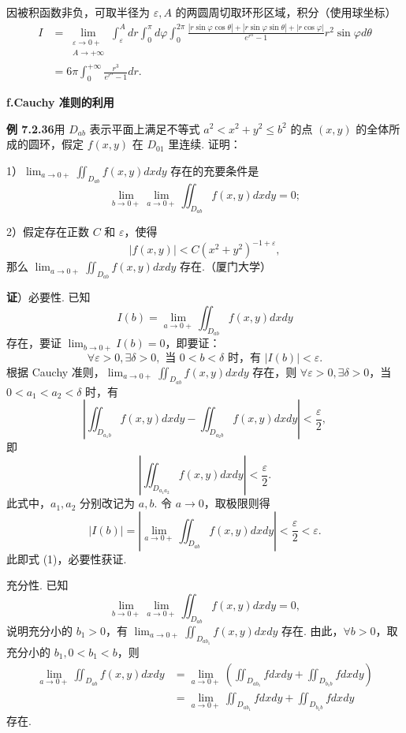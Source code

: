 \documentclass[UTF8, 12pt, fontset=fandol, oneside]{ctexart}
\begin{document}
因被积函数非负，可取半径为 $\varepsilon,A$ 的两圆周切取环形区域，积分（使用球坐标）
\[
\begin{aligned}
I&=\lim_{\substack{\varepsilon\to0+\\A\to+\infty}}
\int_\varepsilon^Adr\int_0^\pi d\varphi\int_0^{2\pi}
\frac{|r\sin\varphi\cos\theta|+|r\sin\varphi\sin\theta|+|r\cos\varphi|}
{e^{r^\alpha}-1}r^2\sin\varphi d\theta\\
&=6\pi\int_0^{+\infty}\frac{r^3}{e^{r^\alpha}-1}dr.
\end{aligned}
\]

\noindent\textbf{f.\quad Cauchy 准则的利用}

\noindent\textbf{例 7.2.36}\quad 用 $D_{ab}$ 表示平面上满足不等式 $a^2<x^2+y^2\le b^2$ 的点 $(x,y)$ 的全体所成的圆环，假定 $f(x,y)$ 在 $D_{01}$ 里连续. 证明：

1）$\displaystyle\lim_{a\to0+}\iint_{D_{ab}}f(x,y)dxdy$ 存在的充要条件是
\[
\lim_{b\to0+}\lim_{a\to0+}\iint_{D_{ab}}f(x,y)dxdy=0;
\]

2）假定存在正数 $C$ 和 $\varepsilon$，使得
\[
|f(x,y)|<C(x^2+y^2)^{-1+\varepsilon},
\]
那么 $\displaystyle\lim_{a\to0+}\iint_{D_{ab}}f(x,y)dxdy$ 存在.（厦门大学）

\noindent\textbf{证}）必要性. 已知
\[
I(b)=\lim_{a\to0+}\iint_{D_{ab}}f(x,y)dxdy
\]
存在，要证 $\lim_{b\to0+}I(b)=0$，即要证：
\[
\forall\varepsilon>0,\exists\delta>0,\text{ 当 }0<b<\delta\text{ 时，有 }|I(b)|<\varepsilon. \tag{1}
\]
根据 Cauchy 准则，$\displaystyle\lim_{a\to0+}\iint_{D_{ab}}f(x,y)dxdy$ 存在，则 $\forall\varepsilon>0,\exists\delta>0$，当 $0<a_1<a_2<\delta$ 时，有
\[
\left|\iint_{D_{a_1b}}f(x,y)dxdy-\iint_{D_{a_2b}}f(x,y)dxdy\right|<\frac\varepsilon2,
\]
即
\[
\left|\iint_{D_{a_1a_2}}f(x,y)dxdy\right|<\frac\varepsilon2.
\]
此式中，$a_1,a_2$ 分别改记为 $a,b$. 令 $a\to0$，取极限则得
\[
|I(b)|=\left|\lim_{a\to0+}\iint_{D_{ab}}f(x,y)dxdy\right|<\frac\varepsilon2<\varepsilon.
\]
此即式 (1)，必要性获证.

充分性. 已知
\[
\lim_{b\to0+}\lim_{a\to0+}\iint_{D_{ab}}f(x,y)dxdy=0,
\]
说明充分小的 $b_1>0$，有 $\displaystyle\lim_{a\to0+}\iint_{D_{ab_1}}f(x,y)dxdy$ 存在. 由此，$\forall b>0$，取充分小的 $b_1,0<b_1<b$，则
\[
\begin{aligned}
\lim_{a\to0+}\iint_{D_{ab}}f(x,y)dxdy
&=\lim_{a\to0+}\left(\iint_{D_{ab_1}}fdxdy+\iint_{D_{b_1b}}fdxdy\right)\\
&=\lim_{a\to0+}\iint_{D_{ab_1}}fdxdy+\iint_{D_{b_1b}}fdxdy
\end{aligned}
\]
存在.
\end{document}
